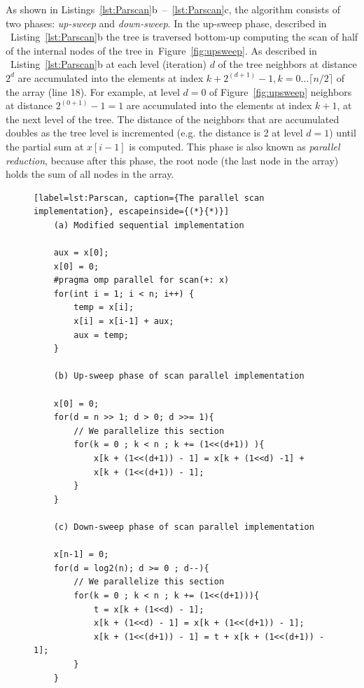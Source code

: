 \documentclass[Ingles]{ic-tese-v1}
\newcommand{\rfig}[1]{Figure~\ref{fig:#1}}
\newcommand{\rlsts}[2]{Listing~\ref{lst:#1}{#2}}
\newcommand{\rlstn}[3]{Listings~\ref{lst:#1}{#2}~--~\ref{lst:#1}{#3}}
\begin{document}
As  shown  in \rlstn{Parscan}{b}{c},  the  algorithm  consists of  two
phases:  \textit{up-sweep} and  \textit{down-sweep}.  In  the up-sweep
phase,  described   in  ~\rlsts{Parscan}{b}  the  tree   is  traversed
bottom-up computing the scan of half of the internal nodes of the tree
in~\rfig{upsweep}.  As described in  ~\rlsts{Parscan}{b} at each level
(iteration)  $d$  of   the  tree  neighbors  at   distance  $2^d$  are
accumulated       into        the       elements        at       index
$k + 2^{(d+1)} - 1, k = 0 \ldots \lceil n/2 \rceil$ of the array (line
18). For  example, at  level $d  = 0$  of \rfig{upsweep}  neighbors at
distance $2^{(0+1)}  - 1  = 1$  are accumulated  into the  elements at
index $k  + 1$, at the  next level of  the tree.  The distance  of the
neighbors  that  are   accumulated  doubles  as  the   tree  level  is
incremented  (e.g.  the  distance is  2 at  level $d  = 1$)  until the
partial sum  at $x[i-1]$  is computed.   This phase  is also  known as
\textit{parallel reduction},  because after this phase,  the root node
(the last node in the array) holds the sum of all nodes in the array.


\begin{figure}[t]
	\lstset{basicstyle=\scriptsize}
	\begin{lstlisting}[label=lst:Parscan, caption={The parallel scan implementation}, escapeinside={(*}{*)}]
	(a) Modified sequential implementation
	
	aux = x[0];
	x[0] = 0;
	#pragma omp parallel for scan(+: x)
	for(int i = 1; i < n; i++) {
		temp = x[i];
		x[i] = x[i-1] + aux;
		aux = temp;
	}
	
	(b) Up-sweep phase of scan parallel implementation
	
	x[0] = 0;
	for(d = n >> 1; d > 0; d >>= 1){
		// We parallelize this section
		for(k = 0 ; k < n ; k += (1<<(d+1)) ){
			x[k + (1<<(d+1)) - 1] = x[k + (1<<d) -1] + 
			x[k + (1<<(d+1)) - 1];
		}
	}
	
	(c) Down-sweep phase of scan parallel implementation
	
	x[n-1] = 0;
	for(d = log2(n); d >= 0 ; d--){
		// We parallelize this section
		for(k = 0 ; k < n ; k += (1<<(d+1))){
			t = x[k + (1<<d) - 1];
			x[k + (1<<d) - 1] = x[k + (1<<(d+1)) - 1];
			x[k + (1<<(d+1)) - 1] = t + x[k + (1<<(d+1)) - 1];
		}
	}
	\end{lstlisting}
\end{figure}
\end{document}
